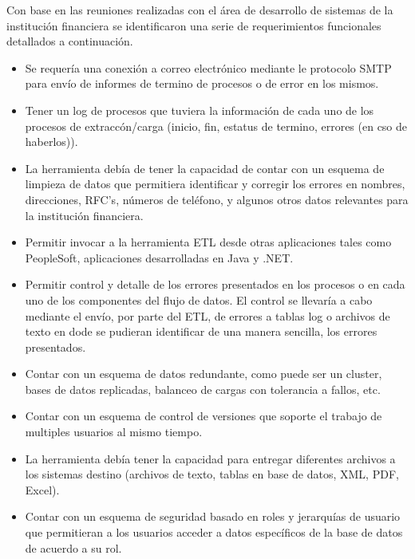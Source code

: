 \documentclass[a4paper,openright,12pt]{book}
\begin{document}
Con base en las reuniones realizadas con el área de desarrollo de sistemas de la
institución financiera se identificaron una serie de requerimientos funcionales
detallados a continuación.

\begin{itemize}

\item Se requería una conexión a correo electrónico mediante le protocolo SMTP
  para envío de informes de termino de procesos o de error en los mismos.

\item Tener un log de procesos que tuviera la información de cada uno de los
  procesos de extraccón/carga (inicio, fin, estatus de termino, errores (en cso
  de haberlos)).

\item La herramienta debía de tener la capacidad de contar con un esquema de
  limpieza de datos que permitiera identificar y corregir los errores en
  nombres, direcciones, RFC's, números de teléfono, y algunos otros datos
  relevantes para la institución financiera.

\item Permitir invocar a la herramienta ETL desde otras aplicaciones tales como
  PeopleSoft, aplicaciones desarrolladas en Java y .NET.

\item Permitir control y detalle de los errores presentados en los procesos o en
  cada uno de los componentes del flujo de datos. El control se llevaría a cabo
  mediante el envío, por parte del ETL, de errores a tablas log o archivos de
  texto en dode se pudieran identificar de una manera sencilla, los errores
  presentados.

\item Contar con un esquema de datos redundante, como puede ser un cluster,
  bases de datos replicadas, balanceo de cargas con tolerancia a fallos, etc.

\item Contar con un esquema de control de versiones que soporte el trabajo de
  multiples usuarios al mismo tiempo.

\item La herramienta debía tener la capacidad para entregar diferentes archivos
  a los sistemas destino (archivos de texto, tablas en base de datos, XML, PDF,
  Excel).

\item Contar con un esquema de seguridad basado en roles y jerarquías de usuario
  que permitieran a los usuarios acceder a datos específicos de la base de datos
  de acuerdo a su rol.


\end{itemize}
\end{document}

